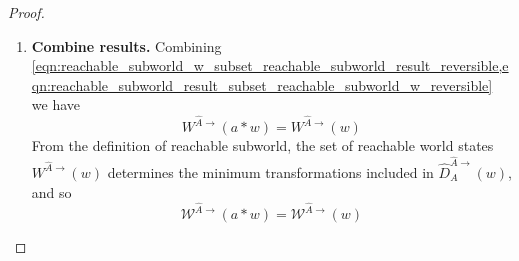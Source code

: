 \begin{proof}
\begin{enumerate}[(1)]
    \item \textbf{Combine results.}
    Combining \cref{eqn:reachable_subworld_w_subset_reachable_subworld_result_reversible,eqn:reachable_subworld_result_subset_reachable_subworld_w_reversible} we have
    \begin{equation}
        W^{\hat{A}\to}(a \ast w) = W^{\hat{A}\to}(w)
    \end{equation}
    From the definition of reachable subworld, the set of reachable world states $W^{\hat{A}\to}(w)$ determines the minimum transformations included in $\hat{D}_{A}^{\hat{A}\to}(w)$, and so
    \begin{equation}
        \mathscr{W}^{\hat{A}\to}(a \ast w) = \mathscr{W}^{\hat{A}\to}(w)
    \end{equation}
\end{enumerate}
\end{proof}

